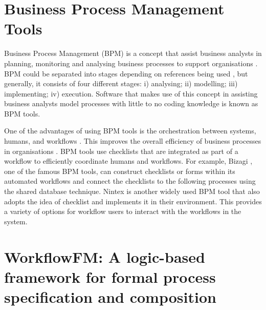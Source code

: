 \section{Business Process Management Tools}
Business Process Management (BPM) is a concept that assist business analysts in planning, monitoring and analysing business processes to support organisations \cite{bpmdefinition}. BPM could be separated into stages depending on references being used \cite{bpmlifecycles, bpmlifecycles3, bpmlifecycles2}, but generally, it consists of four different stages: i) analysing; ii) modelling; iii) implementing; iv) execution. Software that makes use of this concept in assisting business analysts model processes with little to no coding knowledge is known as BPM tools.

One of the advantages of using BPM tools is the orchestration between systems, humans, and workflows \cite{bpmstrength}. This improves the overall efficiency of business processes in organisations \cite{bpmbenefits}. BPM tools use checklists that are integrated as part of a workflow to efficiently coordinate humans and workflows. For example, Bizagi \cite{bizagi}, one of the famous BPM tools, can construct checklists or forms within its automated workflows and connect the checklists to the following processes using the shared database technique. Nintex \cite{nintext} is another widely used BPM tool that also adopts the idea of checklist and implements it in their environment. This provides a variety of options for workflow users to interact with the workflows in the system.


\section{WorkflowFM: A logic-based framework for formal process specification and composition}
\label{background:workflowfm}


